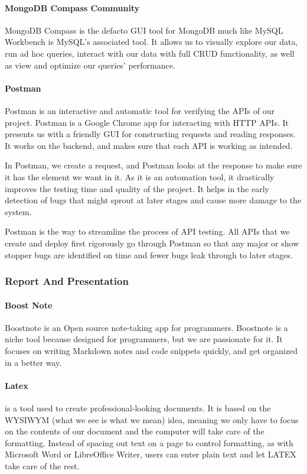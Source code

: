 \paragraph*{MongoDB Compass Community}
MongoDB Compass is the defacto GUI tool for MongoDB much like MySQL Workbench is MySQL’s associated tool. It allows us to visually explore our data, run ad hoc queries, interact with our data with full CRUD functionality, as well as view and optimize our queries’ performance.


\paragraph*{Postman}
Postman is an interactive and automatic tool for verifying the APIs of our project. Postman is a Google Chrome app for interacting with HTTP APIs. It presents us with a friendly GUI for constructing requests and reading responses. It works on the backend, and makes sure that each API is working as intended.

In Postman, we create a request, and Postman looks at the response to make sure it has the element we want in it. As it is an automation tool, it drastically improves the testing time and quality of the project. It helps in the early detection of bugs that might sprout at later stages and cause more damage to the system.

Postman is the way to streamline the process of API testing. All APIs that we create and deploy first rigorously go through Postman so that any major or show stopper bugs are identified on time and fewer bugs leak through to later stages.




\subsubsection{Report And Presentation}
\paragraph*{Boost Note}
Boostnote is an Open source note-taking app for programmers.
Boostnote is a niche tool because designed for programmers, but we are passionate for it.
It focuses on writing Markdown notes and code snippets quickly, and get organized in a better way.

\paragraph*{Latex}
\latex{} is a tool used to create professional-looking documents. It is based on the WYSIWYM (what we see is what we mean) idea, meaning we only have to focus on the contents of our document and the computer will take care of the formatting. Instead of spacing out text on a page to control formatting, as with Microsoft Word or LibreOffice Writer, users can enter plain text and let LATEX take care of the rest.
